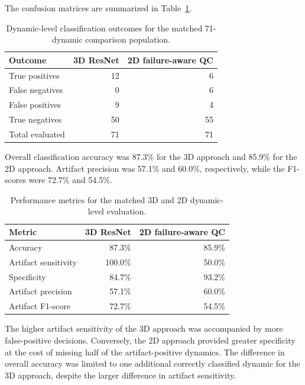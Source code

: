 The confusion matrices are summarized in Table~\ref{tab:results_matched_pipeline_confusion}.

\begin{table}[htbp]
\centering
\caption{Dynamic-level classification outcomes for the matched 71-dynamic comparison population.}
\label{tab:results_matched_pipeline_confusion}
\begin{tabular}{lrr}
\hline
Outcome & 3D ResNet & 2D failure-aware QC \\
\hline
True positives & 12 & 6 \\
False negatives & 0 & 6 \\
False positives & 9 & 4 \\
True negatives & 50 & 55 \\
\hline
Total evaluated & 71 & 71 \\
\hline
\end{tabular}
\end{table}

Overall classification accuracy was 87.3\% for the 3D approach and 85.9\% for the 2D approach. Artifact precision was 57.1\% and 60.0\%, respectively, while the F1-scores were 72.7\% and 54.5\%.

\begin{table}[htbp]
\centering
\caption{Performance metrics for the matched 3D and 2D dynamic-level evaluation.}
\label{tab:results_matched_pipeline_performance}
\begin{tabular}{lrr}
\hline
Metric & 3D ResNet & 2D failure-aware QC \\
\hline
Accuracy & 87.3\% & 85.9\% \\
Artifact sensitivity & 100.0\% & 50.0\% \\
Specificity & 84.7\% & 93.2\% \\
Artifact precision & 57.1\% & 60.0\% \\
Artifact F1-score & 72.7\% & 54.5\% \\
\hline
\end{tabular}
\end{table}


The higher artifact sensitivity of the 3D approach was accompanied by more false-positive decisions. Conversely, the 2D approach provided greater specificity at the cost of missing half of the artifact-positive dynamics. The difference in overall accuracy was limited to one additional correctly classified dynamic for the 3D approach, despite the larger difference in artifact sensitivity.

